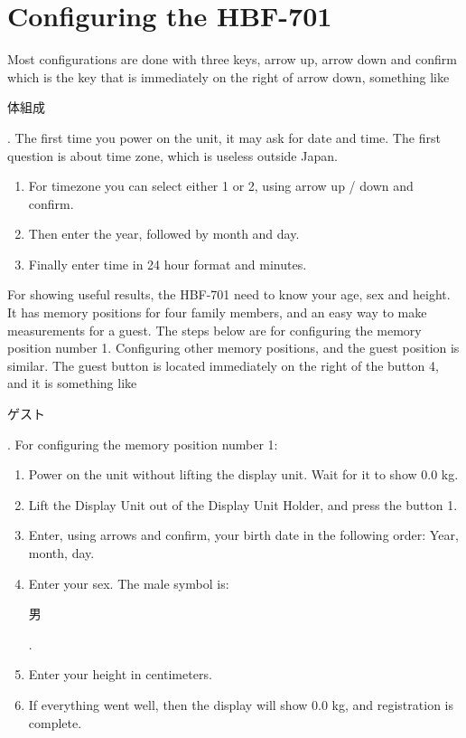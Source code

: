 \documentclass[10pt]{article}
\begin{document}
\section{Configuring the HBF-701}
\label{sec:configuring}
Most configurations are done with three keys, arrow up, arrow down and confirm
which is the key that is immediately on the right of arrow down, something like
\begin{CJK}{UTF8}{min}体組成\end{CJK}. The first time you power on the unit, it
may ask for date and time. The first question is about time zone, which is
useless outside Japan.
\begin{enumerate}
  \item For timezone you can select either 1 or 2, using arrow up / down and
	confirm.
  \item Then enter the year, followed by month and day.
  \item Finally enter time in 24 hour format and minutes.
\end{enumerate}

For showing useful results, the HBF-701 need to know your age, sex and height.
It has memory positions for four family members, and an easy way to make
measurements for a guest. The steps below are for configuring the memory
position number 1. Configuring other memory positions, and the guest position is
similar. The guest button is located immediately on the right of the button 4,
and it is something like \begin{CJK}{UTF8}{min}ゲスト\end{CJK}. For configuring
the memory position number 1:
\begin{enumerate}
  \item Power on the unit without lifting the display unit. Wait for it to show
	0.0 kg.
  \item Lift the Display Unit out of the Display Unit Holder, and press the
	button 1.
  \item Enter, using arrows and confirm, your birth date in the following order:
	Year, month, day.
  \item Enter your sex. The male symbol is: \begin{CJK}{UTF8}{min}男\end{CJK}.
  \item Enter your height in centimeters.
  \item If everything went well, then the display will show 0.0 kg, and
	registration is complete.
\end{enumerate}
\end{document}
